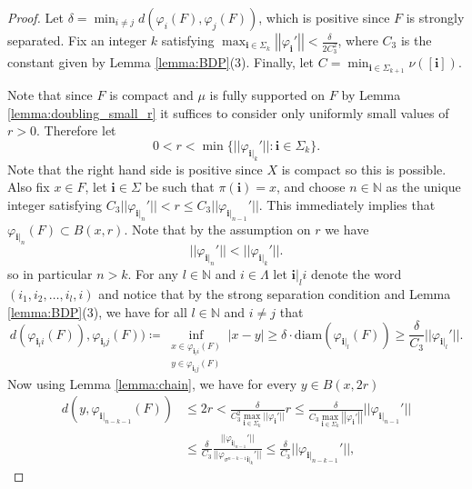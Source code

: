 \documentclass{PRM}
\newcommand{\field}[1]{\mathbb{#1}}
\newcommand{\N}{\field{N}}
\newcommand{\norm}[1]{\left|\left|#1\right|\right|}
\newcommand{\diam}{\mathrm{diam}}
\theoremstyle{plain}
\theoremstyle{definition}
\theoremstyle{remark}
\begin{document}
\begin{proof}
Let $\delta = \min_{i\ne j}d(\varphi_i(F),\varphi_j(F))$, which is positive since $F$ is strongly separated. Fix an integer $k$ satisfying $\max_{\mathbf{i}\in\Sigma_k}\norm{\varphi_{\mathbf{i}}'}< \frac{\delta}{2C_3^2}$, where $C_3$ is the constant given by Lemma \ref{lemma:BDP}(3). Finally, let $C=\min_{\mathbf{i}\in\Sigma_{k+1}}\nu([\mathbf{i}])$.

Note that since $F$ is compact and $\mu$ is fully supported on $F$ by Lemma \ref{lemma:doubling_small_r} it suffices to consider only uniformly small values of $r>0$.
Therefore let 
\begin{equation*}
0<r<\min\{||\varphi_{\mathbf{i}|_k}'||\colon \mathbf{i}\in\Sigma_k\}.
\end{equation*}
Note that the right hand side is positive since $X$ is compact so this is possible. Also fix $x\in F$, let $\mathbf{i}\in\Sigma$ be such that $\pi(\mathbf{i})=x$, and choose $n\in\N$ as the unique integer satisfying $C_3||\varphi_{\mathbf{i}|_n}'||< r \leq C_3||\varphi_{\mathbf{i}|_{n-1}}'||$. This immediately implies that $\varphi_{\mathbf{i}|_n}(F)\subset B(x,r)$. Note that by the assumption on $r$ we have
\begin{equation*}
    ||\varphi_{\mathbf{i}|_n}'|| <||\varphi_{\mathbf{i}|_k}'||.
\end{equation*}
so in particular $n>k$. For any $l\in\N$ and $i\in\Lambda$ let $\mathbf{i}|_li$ denote the word $(i_1,i_2,\ldots, i_l,i)$ and notice that by the strong separation condition and Lemma \ref{lemma:BDP}(3), we have for all $l\in\N$ and $i\ne j$ that
\begin{equation}\label{eq:ssc}
    d(\varphi_{\mathbf{i}_l i}(F)),\varphi_{\mathbf{i}_l j}(F))\coloneqq\inf_{\substack{x\in \varphi_{\mathbf{i}_l i}(F) \\y\in \varphi_{\mathbf{i}_l j}(F)}}|x-y|\geq \delta\cdot \diam(\varphi_{\mathbf{i}|_l}(F))\geq \frac{\delta}{C_3}||\varphi_{\mathbf{i}|_l}'||.
\end{equation}
Now using Lemma \ref{lemma:chain}, we have for every $y\in B(x,2r)$
\begin{align*}
    d(y,\varphi_{\mathbf{i}|_{n-k-1}}(F))&\leq 2r< \frac{\delta}{C_3^2\max_{\mathbf{i}\in\Sigma_k}||\varphi_{\mathbf{i}}'||}r\leq \frac{\delta}{C_3\max_{\mathbf{i}\in\Sigma_k}\norm{\varphi_{\mathbf{i}}'}}||\varphi_{\mathbf{i}|_{n-1}}'||\\
    &\leq\frac{\delta}{C_3}\frac{||\varphi_{\mathbf{i}|_{n-1}}'||}{||\varphi_{\sigma^{n-k-1}\mathbf{i}|_{k}}'||}\leq \frac{\delta}{C_3} ||\varphi_{\mathbf{i}|_{n-k-1}}'||,

\end{align*}
\end{proof}
\end{document}
